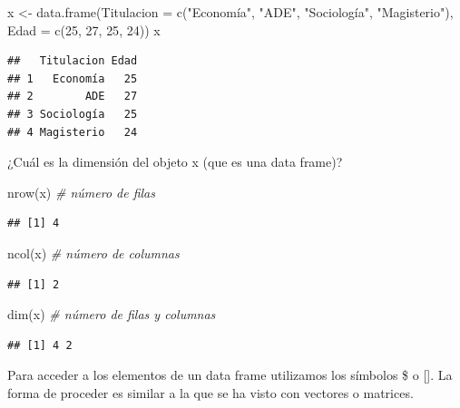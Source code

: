 \documentclass[
]{book}
\newenvironment{Shaded}{\begin{snugshade}}{\end{snugshade}}
\newcommand{\AttributeTok}[1]{\textcolor[rgb]{0.77,0.63,0.00}{#1}}
\newcommand{\CommentTok}[1]{\textcolor[rgb]{0.56,0.35,0.01}{\textit{#1}}}
\newcommand{\DecValTok}[1]{\textcolor[rgb]{0.00,0.00,0.81}{#1}}
\newcommand{\FunctionTok}[1]{\textcolor[rgb]{0.00,0.00,0.00}{#1}}
\newcommand{\NormalTok}[1]{#1}
\newcommand{\OtherTok}[1]{\textcolor[rgb]{0.56,0.35,0.01}{#1}}
\newcommand{\StringTok}[1]{\textcolor[rgb]{0.31,0.60,0.02}{#1}}
\begin{document}
\begin{Shaded}
\begin{Highlighting}[]
\NormalTok{x }\OtherTok{\textless{}{-}} \FunctionTok{data.frame}\NormalTok{(}\AttributeTok{Titulacion =} \FunctionTok{c}\NormalTok{(}\StringTok{"Economía"}\NormalTok{, }\StringTok{"ADE"}\NormalTok{, }\StringTok{"Sociología"}\NormalTok{, }\StringTok{"Magisterio"}\NormalTok{), }\AttributeTok{Edad =} \FunctionTok{c}\NormalTok{(}\DecValTok{25}\NormalTok{, }\DecValTok{27}\NormalTok{, }\DecValTok{25}\NormalTok{, }\DecValTok{24}\NormalTok{))}
\NormalTok{x}
\end{Highlighting}
\end{Shaded}

\begin{verbatim}
##   Titulacion Edad
## 1   Economía   25
## 2        ADE   27
## 3 Sociología   25
## 4 Magisterio   24
\end{verbatim}

¿Cuál es la dimensión del objeto x (que es una data frame)?

\begin{Shaded}
\begin{Highlighting}[]
\FunctionTok{nrow}\NormalTok{(x) }\CommentTok{\# número de filas}
\end{Highlighting}
\end{Shaded}

\begin{verbatim}
## [1] 4
\end{verbatim}

\begin{Shaded}
\begin{Highlighting}[]
\FunctionTok{ncol}\NormalTok{(x) }\CommentTok{\# número de columnas}
\end{Highlighting}
\end{Shaded}

\begin{verbatim}
## [1] 2
\end{verbatim}

\begin{Shaded}
\begin{Highlighting}[]
\FunctionTok{dim}\NormalTok{(x)  }\CommentTok{\# número de filas y columnas}
\end{Highlighting}
\end{Shaded}

\begin{verbatim}
## [1] 4 2
\end{verbatim}

Para acceder a los elementos de un data frame utilizamos los símbolos \$ o {[}{]}. La forma de proceder es similar a la que se ha visto con vectores o matrices.
\end{document}
